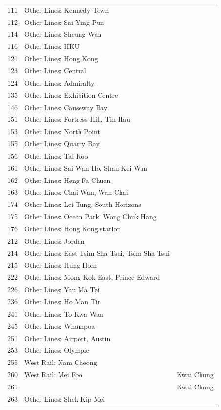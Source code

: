 \begin{longtable}{p{1.5cm}p{8cm}p{4cm}}
111 & Other Lines: Kennedy Town &  \\
112 & Other Lines: Sai Ying Pun &  \\
114 & Other Lines: Sheung Wan &  \\
116 & Other Lines: HKU &  \\
121 & Other Lines: Hong Kong &  \\
123 & Other Lines: Central &  \\
124 & Other Lines: Admiralty &  \\
135 & Other Lines: Exhibition Centre &  \\
146 & Other Lines: Causeway Bay &  \\
151 & Other Lines: Fortress Hill, Tin Hau &  \\
153 & Other Lines: North Point &  \\
155 & Other Lines: Quarry Bay &  \\
156 & Other Lines: Tai Koo &  \\
161 & Other Lines: Sai Wan Ho, Shau Kei Wan &  \\
162 & Other Lines: Heng Fa Chuen &  \\
163 & Other Lines: Chai Wan, Wan Chai &  \\
174 & Other Lines: Lei Tung, South Horizons &  \\
175 & Other Lines: Ocean Park, Wong Chuk Hang &  \\
176 & Other Lines: Hong Kong station &  \\
212 & Other Lines: Jordan &  \\
214 & Other Lines: East Tsim Sha Tsui, Tsim Sha Tsui &  \\
215 & Other Lines: Hung Hom &  \\
222 & Other Lines: Mong Kok East, Prince Edward &  \\
226 & Other Lines: Yau Ma Tei &  \\
236 & Other Lines: Ho Man Tin &  \\
241 & Other Lines: To Kwa Wan &  \\
245 & Other Lines: Whampoa &  \\
251 & Other Lines: Airport, Austin &  \\
253 & Other Lines: Olympic &  \\
255 & West Rail: Nam Cheong &  \\
260 & West Rail: Mei Foo & Kwai Chung \\
261 &  & Kwai Chung \\
263 & Other Lines: Shek Kip Mei &  \\

\end{longtable}
